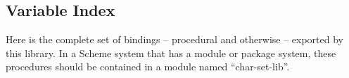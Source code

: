 


\subsection{{Variable Index}}\label{variable-index}

Here is the complete set of bindings -- procedural and otherwise --
exported by this library. In a Scheme system that has a module or
package system, these procedures should be contained in a module named
``char-set-lib''.

